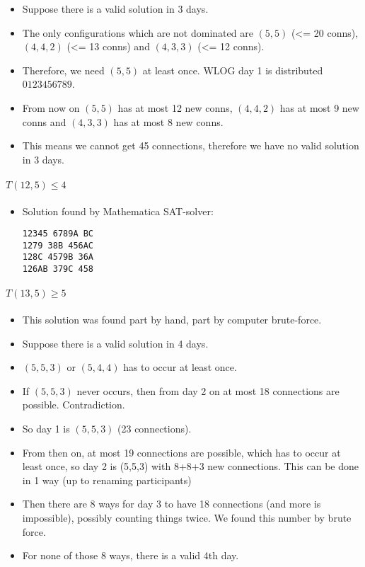 \documentclass[a4paper]{article}
\begin{document}
\begin{itemize}

\item
  Suppose there is a valid solution in 3 days.
\item
  The only configurations which are not dominated are $(5,5)$
  (<= 20 conns), $(4,4,2)$ (<= 13 conns) and
  $(4,3,3)$ (<= 12 conns).
\item
  Therefore, we need $(5,5)$ at least once. WLOG day 1 is
  distributed $0123456789$.
\item
  From now on $(5,5)$ has at most 12 new conns, $(4,4,2)$
  has at most 9 new conns and $(4,3,3)$ has at most 8 new conns.
\item
  This means we cannot get 45 connections, therefore we have no valid
  solution in 3 days.
\end{itemize}

\paragraph{$T(12,5) \leq  4$}

\begin{itemize}
\item
  Solution found by Mathematica SAT-solver:

\begin{verbatim}
12345 6789A BC
1279 38B 456AC
128C 4579B 36A
126AB 379C 458
\end{verbatim}
\end{itemize}

\paragraph{$T(13,5) \geq  5$}

\begin{itemize}

\item
  This solution was found part by hand, part by computer brute-force.
\item
  Suppose there is a valid solution in 4 days.
\item
  $(5,5,3)$ or $(5,4,4)$ has to occur at least once.
\item
  If $(5,5,3)$ never occurs, then from day 2 on at most 18
  connections are possible. Contradiction.
\item
  So day 1 is $(5,5,3)$ (23 connections).
\item
  From then on, at most 19 connections are possible, which has to occur
  at least once, so day 2 is (5,5,3) with 8+8+3 new connections. This
  can be done in 1 way (up to renaming participants)
\item
  Then there are 8 ways for day 3 to have 18 connections (and more is
  impossible), possibly counting things twice. We found this number by
  brute force.
\item
  For none of those 8 ways, there is a valid 4th day.
\end{itemize}
\end{document}
